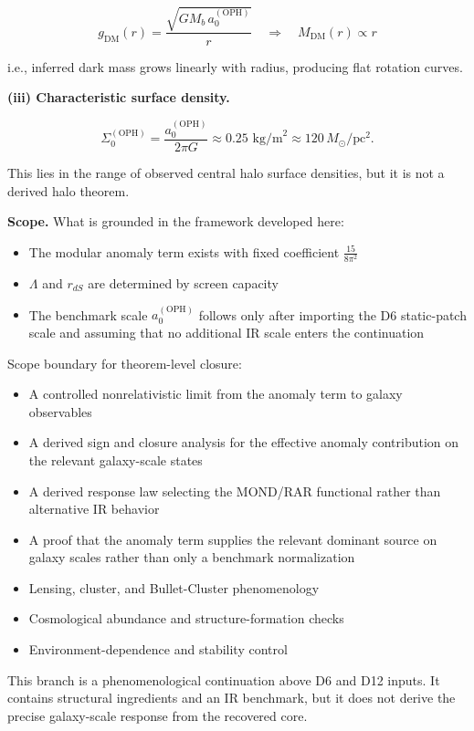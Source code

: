 \[
g_{\mathrm{DM}}(r) = \frac{\sqrt{G M_b \, a_0^{\mathrm{(OPH)}}}}{r}
\quad \Rightarrow \quad
M_{\mathrm{DM}}(r) \propto r
\]

i.e., inferred dark mass grows linearly with radius, producing flat rotation curves.

\textbf{(iii) Characteristic surface density.}

\[
\Sigma_0^{\mathrm{(OPH)}} = \frac{a_0^{\mathrm{(OPH)}}}{2\pi G}
\approx 0.25 \text{ kg/m}^2 \approx 120 \, M_\odot/\text{pc}^2.
\]

This lies in the range of observed central halo surface densities, but it is not a derived halo theorem.

\textbf{Scope.} What is grounded in the framework developed here:

\begin{itemize}
\tightlist
\item
  The modular anomaly term exists with fixed coefficient \(\frac{15}{8\pi^2}\)
\item
  \(\Lambda\) and \(r_{dS}\) are determined by screen capacity
\item
  The benchmark scale \(a_0^{\mathrm{(OPH)}}\) follows only after importing the D6 static-patch scale and assuming that no additional IR scale enters the continuation
\end{itemize}

Scope boundary for theorem-level closure:

\begin{itemize}
\tightlist
\item
  A controlled nonrelativistic limit from the anomaly term to galaxy observables
\item
  A derived sign and closure analysis for the effective anomaly contribution on the relevant galaxy-scale states
\item
  A derived response law selecting the MOND/RAR functional rather than alternative IR behavior
\item
  A proof that the anomaly term supplies the relevant dominant source on galaxy scales rather than only a benchmark normalization
\item
  Lensing, cluster, and Bullet-Cluster phenomenology
\item
  Cosmological abundance and structure-formation checks
\item
  Environment-dependence and stability control
\end{itemize}

This branch is a phenomenological continuation above D6 and D12 inputs. It contains structural ingredients and an IR benchmark, but it does not derive the precise galaxy-scale response from the recovered core.

